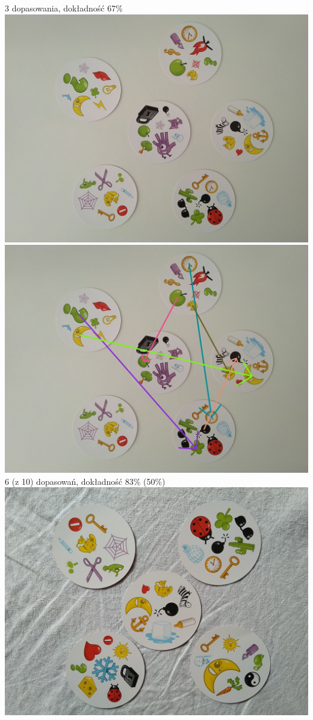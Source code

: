 \documentclass[10pt,a4paper]{article}
\begin{document}
\begin{center}
3 dopasowania, dokładność 67\%
\includegraphics[scale=0.28]{hard/dobble20.jpg}
\includegraphics[scale=0.28]{hard/img_arrows20.jpg}\\
6 (z 10) dopasowań, dokładność 83\% (50\%)
\includegraphics[scale=0.28]{hard/dobble25.jpg}

\end{center}
\end{document}
